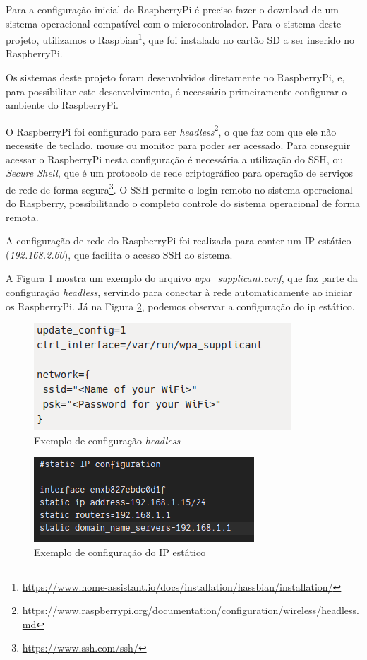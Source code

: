 Para a configuração inicial do RaspberryPi é preciso fazer o download de um sistema operacional compatível com o microcontrolador. Para o sistema deste projeto, utilizamos o Raspbian\footnote{\url{https://www.home-assistant.io/docs/installation/hassbian/installation/}}, que foi instalado no cartão SD a ser inserido no RaspberryPi.


Os sistemas deste projeto foram desenvolvidos diretamente no RaspberryPi, e, para possibilitar este desenvolvimento, é necessário primeiramente configurar o ambiente do RaspberryPi.

O RaspberryPi foi configurado para ser \textit{headless}\footnote{\url{https://www.raspberrypi.org/documentation/configuration/wireless/headless.md}}, o que faz com que ele não necessite de teclado, mouse ou monitor para poder ser acessado. Para conseguir acessar o RaspberryPi nesta configuração é necessária a utilização do SSH, ou \textit{Secure Shell}, que é um protocolo de rede criptográfico para operação de serviços de rede de forma segura\footnote{\url{https://www.ssh.com/ssh/}}. O SSH permite o login remoto no sistema operacional do Raspberry, possibilitando o completo controle do sistema operacional de forma remota.

A configuração de rede do RaspberryPi foi realizada para conter um IP estático (\textit{192.168.2.60}), que facilita o acesso SSH ao sistema.

A Figura \ref{fig:headless} mostra um exemplo do arquivo \textit{wpa\_supplicant.conf}, que faz parte da configuração \textit{headless}, servindo para conectar à rede automaticamente ao iniciar os RaspberryPi. Já na Figura \ref{fig:rpiip}, podemos observar a configuração do ip estático.

\begin{figure}[htbp]
	\centering
	\includegraphics[width=0.6\linewidth]{figuras/headless.png}
	\caption{Exemplo de configuração \textit{headless}}
	\label{fig:headless}
\end{figure}

\begin{figure}[htbp]
	\centering
	\includegraphics[width=0.6\linewidth]{figuras/rpiip.png}
	\caption{Exemplo de configuração do IP estático}
	\label{fig:rpiip}
\end{figure}

